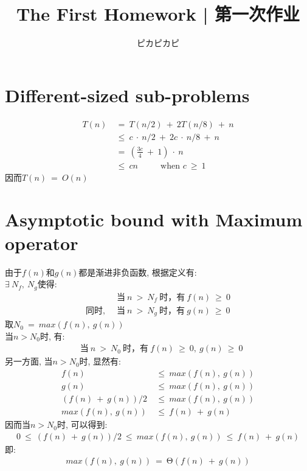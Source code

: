 \documentclass{article}
\begin{document}
 
 
 
\title{The First Homework  | 第一次作业}
\author{ピカピカピ}
 
\maketitle

\section{Different-sized sub-problems}
\begin{align*}
T(n)\ &=\ T(n/2)\ +\ 2T(n/8)\ +\ n \\
&\leq \ c\ \cdot \ n/2\ +\ 2c\ \cdot\ n/8\ +\ n \\
&=\ (\frac{3c}{4}\ +\ 1)\ \cdot \ n \\
&\leq \ cn\ \ \ \ \ \ \ \ \ \ \ \ \mbox{when $c\ \geq \ 1$}
\end{align*}
因而$T(n)\ =\ O(n)$

\section{Asymptotic bound with Maximum operator}
由于$f(n)$和$g(n)$都是渐进非负函数, 根据定义有: \\
$\exists \ N_f,\ N_g$使得: 
\begin{align*}
& \mbox{当}\ n\ >\ N_f\ \mbox{时}，\mbox{有}\ f(n)\ \geq \ 0 \\
\mbox{同时, }\ & \mbox{当}\ n\ >\ N_g\ \mbox{时}，\mbox{有}\ g(n)\ \geq\ 0
\end{align*}
取$N_0\ =\ max(f(n),\ g(n))$\\
当$n > N_0$时, 有:
\begin{align*}
& \mbox{当}\ n\ >\ N_0\ \mbox{时}，\mbox{有}\ f(n)\ \geq\ 0,\ g(n)\ \geq\ 0
\end{align*}
另一方面, 当$n > N_0$时, 显然有: 
\begin{align*}
f(n)\ & \leq \ max(f(n),\ g(n)) \\
g(n)\ & \leq \ max(f(n),\ g(n)) \\
(f(n)\ +\ g(n))/2\ & \leq \ max(f(n),\ g(n)) \\
max(f(n),\ g(n))\ & \leq \ f(n)\ +\ g(n)
\end{align*}
因而当$n > N_0$时, 可以得到: 
\begin{align*}
0\ \leq\ (f(n)\ +\ g(n))/2\ \leq \  max(f(n),\ g(n)) \ \leq \ f(n)\ +\ g(n)
\end{align*}
即: 
\begin{align*}
max(f(n),\ g(n))\ =\ \mbox{Θ}(f(n)\ +\ g(n))
\end{align*}
\end{document}

